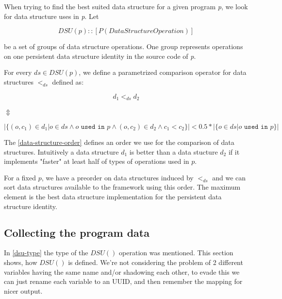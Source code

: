 \documentclass[a4paper,11pt]{article}
\begin{document}
		When trying to find the best suited data structure for a given program \emph{p}, we look for data structure
		uses in \emph{p}. Let

		\begin{equation} \label{dsu-type}
			DSU(p) :: [P(DataStructureOperation)]
		\end{equation}

		be a set of groups of data structure operations. One group represents operations on one persistent
        data structure identity in the source code of \emph{p}.

		For every $ds \in DSU(p)$, we define a parametrized comparison operator for data structures $<_{ds}$
		defined as:

		\begin{center}

			\begin{equation}
				d_1 <_{ds} d_2
			\end{equation}

			$\Updownarrow$

			\begin{equation} \label{data-structure-order}
|\{(o, c_1) \in d_1 | o \in ds \wedge o \texttt{ used in $p$} \wedge (o,c_2) \in d_2 \wedge c_1 < c_2 \}| < 0.5 *
 |\{o \in ds | o \texttt{ used in $p$} \}|
			\end{equation}

		\end{center}

		The \autoref{data-structure-order} defines an order we use for the comparison of data
		structures. Intuitively a data structure $d_1$ is better than a data stucture $d_2$ if
		it implements "faster" at least half of types of operations used in $p$.

		For a fixed $p$, we have a preorder on data structures induced by $<_{ds}$ and we can sort data structures
		available to the framework using this order. The maximum element is the best data structure
		implementation for the persistent data structure identity.

	\subsection{Collecting the program data} \label{dsu-definition}

		In \autoref{dsu-type} the type of the $DSU()$ operation was mentioned. This section shows, how $DSU()$ is
		defined. We're not considering the problem of 2 different variables having the same name and/or shadowing each
        other, to evade this we can just rename each variable to an UUID, and then remember the mapping for nicer
        output.
\end{document}
